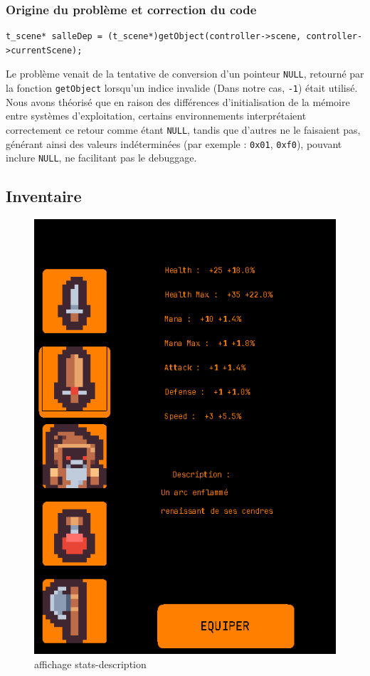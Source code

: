 \documentclass[a4paper,11pt]{article}
\begin{document}
\subsubsection{Origine du problème et correction du code}

\begin{lstlisting}[caption={Ligne fautive}, label=code:fautive]
t_scene* salleDep = (t_scene*)getObject(controller->scene, controller->currentScene);
\end{lstlisting}

Le problème venait de la tentative de conversion d'un pointeur \texttt{NULL}, retourné par la fonction \texttt{getObject} lorsqu'un indice invalide (Dans notre cas, \texttt{-1}) était utilisé.
Nous avons théorisé que en raison des différences d'initialisation de la mémoire entre systèmes d'exploitation, certains environnements interprétaient correctement ce retour comme étant \texttt{NULL}, tandis que d'autres ne le faisaient pas, générant ainsi des valeurs indéterminées (par exemple : \texttt{0x01}, \texttt{0xf0}), pouvant inclure \texttt{NULL}, ne facilitant pas le debuggage.

\newpage

\subsection{Inventaire}

\begin{figure}[ht]
    \centering 
    \includegraphics[width=0.75\linewidth]{./img/affichageStats.png} 
    \caption{ affichage stats-description} 
    \label{fig:inventaire}
\end{figure}
\end{document}
